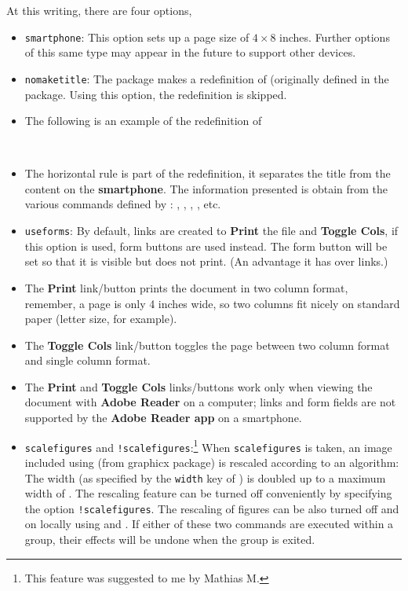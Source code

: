 \documentclass{article}
\makeatletter
\renewcommand{\makeinlinetitle}
{%
    \begingroup\parskip0pt\parindent0pt
    \par\vspace*{6pt}
    \noindent\makebox[\linewidth][c]{\bfseries
    \color{\webuniversity@color}\webuniversity}\par\kern6pt\noindent
    \makebox[\linewidth][c]{\parbox[c]{.75\linewidth}{\centering
    \bfseries\color{\webtitle@color}\webtitle}}\par\kern12pt
    \noindent\parbox{\linewidth}{\scriptsize
        \web@copyright\space\the\year\hfill\thewebemail\\
        \@date\hfill\@ifundefined{aeb@talksite}{\webversion}
            {\ifx\aeb@talksite\@empty\webversion
              \else\aeb@talksite\fi}%
        }\par
    \noindent\makebox[\linewidth]{\rule{.67\linewidth}{.4pt}}%
    \par\endgroup
}
\makeatother
\begin{document}
At this writing, there are four options,
\begin{itemize}
\item \texttt{smartphone}: This option sets up a page size of $ 4\times8 $ inches.
Further options of this same type may appear in the future to support
other devices.
\item \texttt{nomaketitle}: The package makes a redefinition of
     (originally defined in the {\Web} package. Using
    this option, the redefinition is skipped.

\item[] The following is an example of the redefinition of 

\makeinlinetitle

\item[] The horizontal rule is part of the redefinition, it separates the title
from the content on the \textbf{smartphone}. The information presented is
obtain from the various commands defined by {\Web}: ,
, , , etc.

\item \texttt{useforms}: By default, links are created to
    \textbf{Print} the file and \textbf{Toggle Cols}, if this option
    is used, form buttons are used instead. The form button will be
    set so that it is visible but does not print. (An advantage it has
    over links.)

    \item[] The \textbf{Print} link/button prints the document in two
    column format, remember, a page is only 4 inches wide, so two columns
    fit nicely on standard paper (letter size, for example).

    \item[] The \textbf{Toggle Cols} link/button toggles the page between
    two column format and single column format.

    \item[] The \textbf{Print} and \textbf{Toggle Cols} links/buttons work
    only when viewing the document with \textbf{Adobe Reader} on a computer; links
    and form fields are not supported by the \textbf{Adobe Reader app} on a
    smartphone.

\item \texttt{scalefigures} and \texttt{!scalefigures}:\footnote{This feature was suggested to me by Mathias M.}  When
\texttt{scalefigures} is taken, an image included using
 (from \textsf{graphicx} package) is rescaled
according to an algorithm: The width (as specified by the \texttt{width} key of
) is doubled up to a maximum width
of . The rescaling feature can be turned off conveniently by
specifying the option \texttt{!scalefigures}. The rescaling of figures can
be also turned off and on locally using  and
. If either of these two commands are executed within
a group, their effects will be undone when the group is exited.
\end{itemize}
\end{document}
